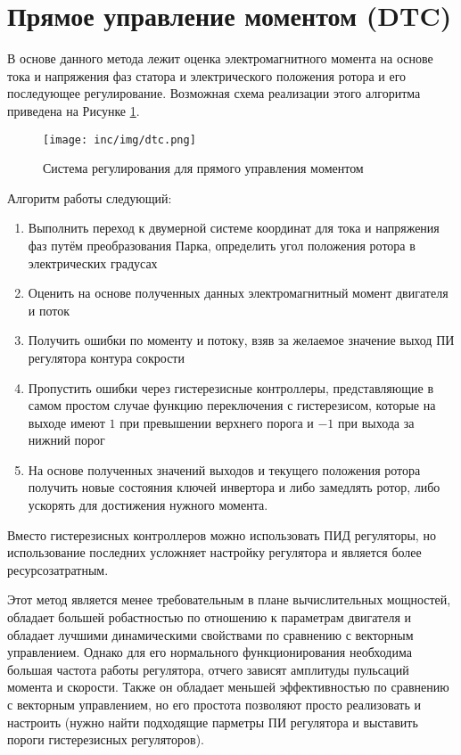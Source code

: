 \section{Прямое управление моментом (DTC)}

В основе данного метода лежит оценка электромагнитного момента на основе тока и напряжения фаз статора и электрического положения ротора и его последующее регулирование. Возможная схема реализации этого алгоритма приведена на Рисунке \ref{pic:dtc}.

\begin{figure}[!h]
\centering
\texttt{[image: inc/img/dtc.png]}
\caption{Система регулирования для прямого управления моментом \cite{art:bdlc_adv_control_techs}}
\label{pic:dtc}
\end{figure}

Алгоритм работы следующий:
\begin{enumerate}
	\item Выполнить переход к двумерной системе координат для тока и напряжения фаз путём преобразования Парка, определить угол положения ротора в электрических градусах
	\item Оценить на основе полученных данных электромагнитный момент двигателя и поток
	\item Получить ошибки по моменту и потоку, взяв за желаемое значение выход ПИ регулятора контура сокрости
	\item Пропустить ошибки через гистерезисные контроллеры, представляющие в самом простом случае функцию переключения с гистерезисом, которые на выходе имеют $1$ при превышении верхнего порога и $-1$ при выхода за нижний порог
	\item На основе полученных значений выходов и текущего положения ротора получить новые состояния ключей инвертора и либо замедлять ротор, либо ускорять для достижения нужного момента.
\end{enumerate}

Вместо гистерезисных контроллеров можно использовать ПИД регуляторы, но использование последних усложняет настройку регулятора и является более ресурсозатратным.

Этот метод является менее требовательным в плане вычислительных мощностей, обладает большей робастностью по отношению к параметрам двигателя и обладает лучшими динамическими свойствами по сравнению с векторным управлением. Однако для его нормального функционирования необходима большая частота работы регулятора, отчего зависят амплитуды пульсаций момента и скорости. Также он обладает меньшей эффективностью по сравнению с векторным управлением, но его простота позволяют просто реализовать и настроить (нужно найти подходящие парметры ПИ регулятора и выставить пороги гистерезисных регуляторов).